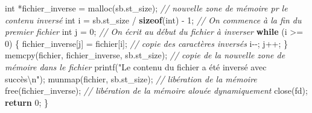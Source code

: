\documentclass[
]{article}
\newenvironment{Shaded}{}{}
\newcommand{\CommentTok}[1]{\textcolor[rgb]{0.38,0.63,0.69}{\textit{#1}}}
\newcommand{\ControlFlowTok}[1]{\textcolor[rgb]{0.00,0.44,0.13}{\textbf{#1}}}
\newcommand{\DataTypeTok}[1]{\textcolor[rgb]{0.56,0.13,0.00}{#1}}
\newcommand{\DecValTok}[1]{\textcolor[rgb]{0.25,0.63,0.44}{#1}}
\newcommand{\KeywordTok}[1]{\textcolor[rgb]{0.00,0.44,0.13}{\textbf{#1}}}
\newcommand{\NormalTok}[1]{#1}
\newcommand{\SpecialCharTok}[1]{\textcolor[rgb]{0.25,0.44,0.63}{#1}}
\newcommand{\StringTok}[1]{\textcolor[rgb]{0.25,0.44,0.63}{#1}}
\begin{document}
\begin{Shaded}
\begin{Highlighting}[]
    \DataTypeTok{int}\NormalTok{ *fichier\_inverse = malloc(sb.st\_size); }\CommentTok{// nouvelle zone de mémoire pr le contenu inversé}
    \DataTypeTok{int}\NormalTok{ i = sb.st\_size / }\KeywordTok{sizeof}\NormalTok{(}\DataTypeTok{int}\NormalTok{) {-} }\DecValTok{1}\NormalTok{; }\CommentTok{// On commence à la fin du premier fichier}
    \DataTypeTok{int}\NormalTok{ j = }\DecValTok{0}\NormalTok{; }\CommentTok{// On écrit au début du fichier à inverser}
    \ControlFlowTok{while}\NormalTok{ (i \textgreater{}= }\DecValTok{0}\NormalTok{) \{}
\NormalTok{        fichier\_inverse[j] = fichier[i]; }\CommentTok{// copie des caractères inversés}
\NormalTok{        i{-}{-};}
\NormalTok{        j++;}
\NormalTok{    \}}
\NormalTok{    memcpy(fichier, fichier\_inverse, sb.st\_size); }\CommentTok{// copie de la nouvelle zone de mémoire dans le fichier}
\NormalTok{    printf(}\StringTok{"Le contenu du fichier a été inversé avec succès}\SpecialCharTok{\textbackslash{}n}\StringTok{"}\NormalTok{);}
\NormalTok{    munmap(fichier, sb.st\_size); }\CommentTok{// libération de la mémoire}
\NormalTok{    free(fichier\_inverse); }\CommentTok{// libération de la mémoire alouée dynamiquement}
\NormalTok{    close(fd);}
    \ControlFlowTok{return} \DecValTok{0}\NormalTok{;}
\NormalTok{\}}
\end{Highlighting}
\end{Shaded}
\end{document}
